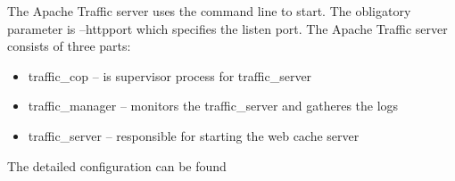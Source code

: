 The Apache Traffic server uses the command line to start. The obligatory parameter is --httpport which specifies the listen port. The Apache Traffic server consists of three parts:

\begin{itemize}
	\item traffic\_cop -- is supervisor process for traffic\_server 
	\item traffic\_manager -- monitors the traffic\_server and gatheres the logs
	\item traffic\_server -- responsible for starting the web cache server
\end{itemize}

The detailed configuration can be found \cite{ats_site}

\newpage